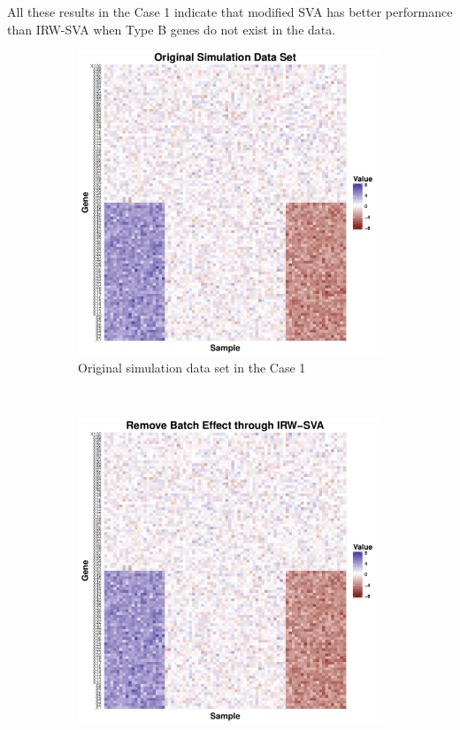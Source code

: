 \documentclass[11pt]{article}
\begin{document}
All these results in the Case 1 indicate that modified SVA has better performance than IRW-SVA when Type B genes do not exist in the data.

\begin{figure}[h!]
    \centering
    \begin{subfigure}[b]{0.31\textwidth}
        \centering
        \includegraphics[width = \textwidth]{figures/simulate1.pdf}
        \caption{Original simulation data set in the Case 1}
        \label{fig:data1}
    \end{subfigure}%
~
    \begin{subfigure}[b]{0.31\textwidth}
        \centering
        \includegraphics[width = \textwidth]{figures/sva1.pdf}

\end{subfigure}
\end{figure}
\end{document}
